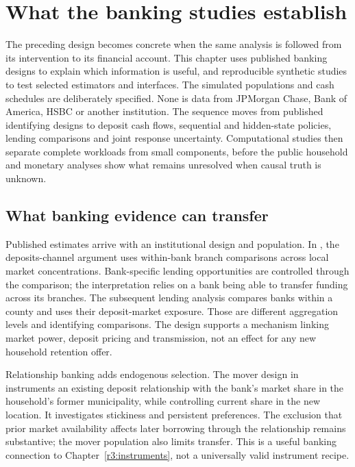 \chapter{What the banking studies establish}
\label{r3:banking-studies}

The preceding design becomes concrete when the same analysis is followed
from its intervention to its financial account. This chapter uses published
banking designs to explain which information is useful, and reproducible
synthetic studies to test selected estimators and interfaces. The simulated
populations and cash schedules are deliberately specified. None is data
from JPMorgan Chase, Bank of America, HSBC or another institution. The sequence moves from published identifying designs to deposit cash flows, sequential and hidden-state policies, lending comparisons and joint response uncertainty. Computational studies then separate complete workloads from small components, before the public household and monetary analyses show what remains unresolved when causal truth is unknown.

\section{What banking evidence can transfer}
\label{r3:banking-evidence}

Published estimates arrive with an institutional design and population.
In \citet[printed pp.2--4]{drechsler2017}, the deposits-channel argument
uses within-bank branch comparisons across local market concentrations.
Bank-specific lending opportunities are controlled through the comparison;
the interpretation relies on a bank being able to transfer funding across
its branches. The subsequent lending analysis compares banks within a
county and uses their deposit-market exposure. Those are different
aggregation levels and identifying comparisons. The design supports a
mechanism linking market power, deposit pricing and transmission, not
an effect for any new household retention offer.

Relationship banking adds endogenous selection. The mover design in
\citet[Section 4.2.1, equations (6)--(8)]{basten2026} instruments an
existing deposit relationship with the bank's market share in the
household's former municipality, while controlling current share in
the new location. It investigates stickiness and persistent preferences.
The exclusion that prior market availability affects later borrowing
through the relationship remains substantive; the mover population
also limits transfer. This is a useful banking connection to
Chapter~\ref{r3:instruments}, not a universally valid instrument recipe.

